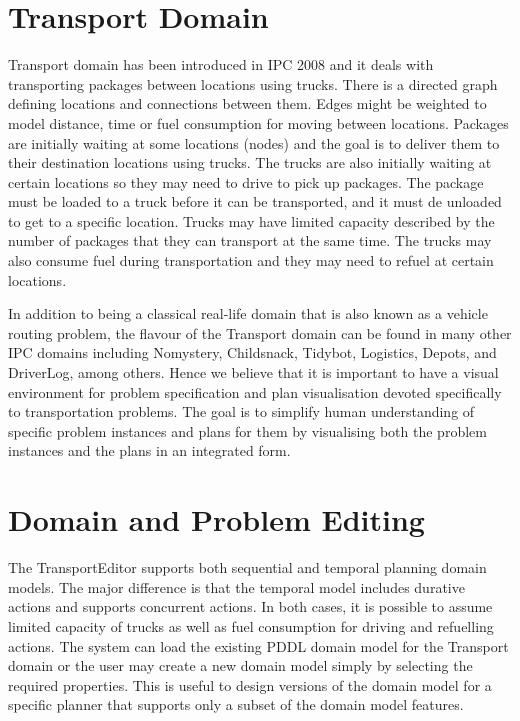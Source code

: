 \documentclass[letterpaper]{article}
\begin{document}
\section{Transport Domain}
Transport domain has been introduced in IPC 2008 and it deals with transporting packages between locations using trucks. There is a directed graph defining locations and connections between them. Edges might be weighted to model distance, time or fuel consumption for moving between locations. Packages are initially waiting at some locations (nodes) and the goal is to deliver them to their destination locations using trucks. The trucks are also initially waiting at certain locations so they may need to drive to pick up packages. The package must be loaded to a truck before it can be transported, and it must de unloaded to get to a specific location. Trucks may have limited capacity described by the number of packages that they can transport at the same time. The trucks may also consume fuel during transportation and they may need to refuel at certain locations.

In addition to being a classical real-life domain that is also known as a vehicle routing problem, the flavour of the Transport domain can be found in many other IPC domains including Nomystery, Childsnack, Tidybot, Logistics, Depots, and DriverLog,  among others. Hence we believe that it is important to have a visual environment for problem specification and plan visualisation devoted specifically to transportation problems. The goal is to simplify human understanding of specific problem instances and plans for them by visualising both the problem instances and the plans in an integrated form. 


\section{Domain and Problem Editing}
The TransportEditor supports both sequential and temporal planning domain models. The major difference is that the temporal model includes durative actions and supports concurrent actions. In both cases, it is possible to assume limited capacity of trucks as well as fuel consumption for driving and refuelling actions. The system can load the existing PDDL domain model for the Transport domain or the user may create a new domain model simply by selecting the required properties. This is useful to design versions of the domain model for a specific planner that supports only a subset of the domain model features.
\end{document}
